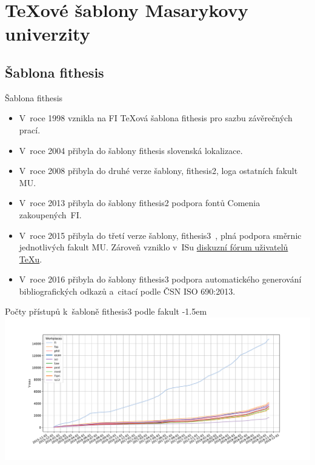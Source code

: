 \documentclass[
  aspectratio=169,
]{beamer}
\makeatletter
\newcommand\odkaz[2]{\textcolor{mubeamer@base}{\href{#1}{#2}}}
\makeatother
\begin{document}
\section[\TeX ové šablony MU]{\TeX ové šablony Masarykovy univerzity}
\subsection{Šablona fithesis}

\begin{frame}{Šablona fithesis}
\begin{itemize}
\item V~roce 1998 vznikla na FI \TeX ová \alert{šablona fithesis pro sazbu závěrečných prací}.
\item V~roce 2004 přibyla do šablony fithesis slovenská lokalizace.
\item V~roce 2008 přibyla do druhé verze šablony, \alert{fithesis2, loga ostatních fakult MU}.
\item V~roce 2013 přibyla do šablony fithesis2 podpora fontů Comenia zakoupených~FI.
\item V~roce 2015 přibyla do třetí verze šablony, \alert{fithesis3~\cite{novotny15}, plná podpora směrnic jednotlivých fakult MU}. Zároveň vzniklo v~ISu \odkaz{https://is.muni.cz/auth/df/fithesis-sazba/}{diskuzní fórum uživatelů \TeX u}.
\item V~roce 2016 přibyla do šablony fithesis3 podpora automatického generování bibliografických odkazů a~citací podle ČSN ISO 690:2013.
\end{itemize}
\end{frame}

\begin{frame}{Počty přístupů k~šabloně fithesis3 podle fakult}
\kern-1.5em\leavevmode{}\textwidth\relax
\includegraphics[width=1.1\textwidth]{figs/fithesis}
\end{frame}
\end{document}

